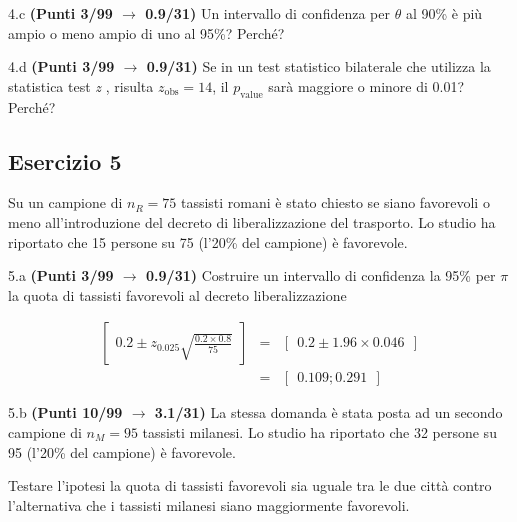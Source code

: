 \documentclass[
  11pt,
]{book}
\theoremstyle{mytheoremstyle}
\theoremstyle{mydefstyle}
\newenvironment{sol}
  {
  \begin{tcolorbox}[enhanced,breakable,arc=0.1mm,boxrule=1pt,colback=white,colframe=iblue,
  title=\bf \fontfamily{lmss}\selectfont \hspace{.5 cm} Soluzione,drop fuzzy shadow]

}{
\end{tcolorbox}
  }
\begin{document}
4.c \textbf{(Punti 3/99 \(\rightarrow\) 0.9/31)} Un intervallo di confidenza per \(\theta\) al 90\% è più ampio o meno ampio di uno al 95\%? Perché?

4.d \textbf{(Punti 3/99 \(\rightarrow\) 0.9/31)} Se in un test statistico bilaterale che utilizza la statistica test \emph{z} , risulta \(z_\text{obs}=14\), il \(p_\text{value}\) sarà maggiore o minore di 0.01? Perché?

\subsection{Esercizio 5}\label{esercizio-5-16}

Su un campione di \(n_R=75\) tassisti romani è stato chiesto se siano favorevoli o meno all'introduzione
del decreto di liberalizzazione del trasporto. Lo studio ha riportato che 15 persone su 75 (l'20\% del campione) è favorevole.

5.a \textbf{(Punti 3/99 \(\rightarrow\) 0.9/31)} Costruire un intervallo di confidenza la 95\% per \(\pi\) la quota di tassisti favorevoli al decreto liberalizzazione

\begin{sol}
\begin{eqnarray*}
  \left[~~0.2\pm z_{0.025}\sqrt{\frac{0.2\times 0.8}{75}}~~\right] &=&
  \left[~~0.2\pm 1.96\times0.046~~\right]\\
  &=&\left[~~0.109; 0.291~~\right]
\end{eqnarray*}

\end{sol}

5.b \textbf{(Punti 10/99 \(\rightarrow\) 3.1/31)} La stessa domanda è stata posta ad un secondo
campione di \(n_M=95\) tassisti milanesi. Lo studio ha riportato che 32 persone su 95 (l'20\% del campione) è favorevole.

Testare l'ipotesi la quota di tassisti favorevoli sia uguale tra le due città contro
l'alternativa che i tassisti milanesi siano maggiormente favorevoli.
\end{document}
